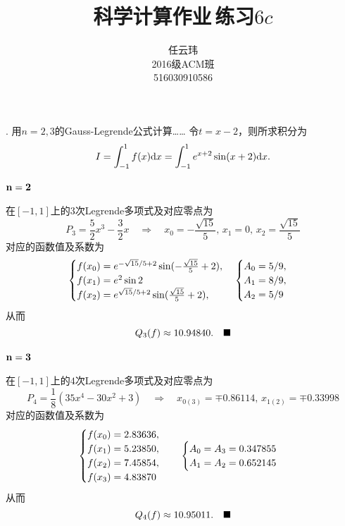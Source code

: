 

\title{科学计算作业$\,$练习$6c$}
\author{\small 任云玮\\\small2016级ACM班\\\small516030910586}
\date{}


\maketitle

. 用$n=2,3$的Gauss-Legrende公式计算……
\ans
  令$t=x-2$，则所求积分为
  \[
    I = \int_{-1}^1 \mathnormal{f}(x)\mathrm{d} x = \int_{-1}^1 e^{x+2}\sin(x+2)\mathrm{d} x.
  \]
  \paragraph{$\mathbf{n = 2}$}
    在$[-1, 1]$上的$3$次Legrende多项式及对应零点为
      \[
        P_3 = \frac{5}{2}x^3 - \frac{3}{2}x \quad\Rightarrow\quad
        x_0 = -\frac{\sqrt{15}}{5},\,x_1 = 0,\,x_2 = \frac{\sqrt{15}}{5}
      \]
    对应的函数值及系数为
    \[
      \begin{cases}
        \mathnormal{f}(x_0) = e^{-\sqrt{15}/5+2}\sin(-\frac{\sqrt{15}}{5}+2),\\
        \mathnormal{f}(x_1) = e^{2}\sin 2 \\
        \mathnormal{f}(x_2) = e^{\sqrt{15}/5+2}\sin(\frac{\sqrt{15}}{5}+2),
      \end{cases}
      \begin{cases}
        A_0 = 5/9, \\
        A_1 = 8/9, \\
        A_2 = 5/9
      \end{cases}
    \]
    从而
    \[
      Q_3(\mathnormal{f}) \approx 10.94840.\quad\blacksquare
    \]
  \paragraph{$\mathbf{n = 3}$}
      在$[-1, 1]$上的$4$次Legrende多项式及对应零点为
        \[
          P_4 = \frac{1}{8}\left( 35x^4 - 30x^2 + 3 \right) \quad\Rightarrow\quad
          x_{0(3)} = \mp0.86114,\, x_{1(2)} = \mp0.33998
        \]
      对应的函数值及系数为
      \[
        \begin{cases}
          \mathnormal{f}(x_0) = 2.83636,\\
          \mathnormal{f}(x_1) = 5.23850,\\
          \mathnormal{f}(x_2) = 7.45854,\\
          \mathnormal{f}(x_3) = 4.83870
        \end{cases}
        \quad
        \begin{cases}
          A_0 = A_3 = 0.347855\\
          A_1 = A_2 = 0.652145
        \end{cases}
      \]
      从而
      \[
        Q_4(\mathnormal{f}) \approx 10.95011.\quad\blacksquare
      \]

